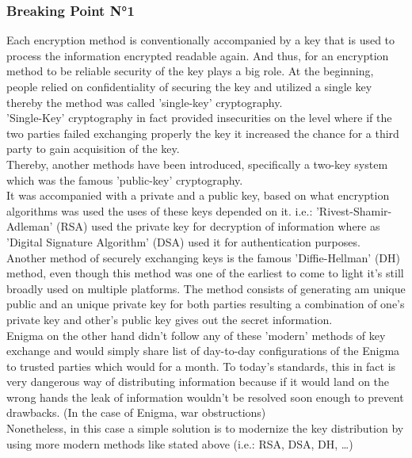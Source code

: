 \documentclass[conference,compsoc]{IEEEtran}
\begin{document}
\subsubsection{Breaking Point N°1} Each encryption method is conventionally accompanied by a key that is used to process the information encrypted readable again. And thus, for an encryption method to be reliable security of the key plays a big role. At the beginning, people relied on confidentiality of securing the key and utilized a single key thereby the method was called 'single-key' cryptography.\\
'Single-Key' cryptography in fact provided insecurities on the level where if the two parties failed exchanging properly the key it increased the chance for a third party to gain acquisition of the key.\\
Thereby, another methods have been introduced, specifically a two-key system which was the famous 'public-key' cryptography.\\
It was accompanied with a private and a public key, based on what encryption algorithms was used the uses of these keys depended on it. i.e.: 'Rivest-Shamir-Adleman' (RSA) used the private key for decryption of information where as 'Digital Signature Algorithm' (DSA) used it for authentication purposes.\\
Another method of securely exchanging keys is the famous 'Diffie-Hellman' (DH) method, even though this method was one of the earliest to come to light it's still broadly used on multiple platforms. The method consists of generating am unique public and an unique private key for both parties resulting a combination of one's private key and other's public key gives out the secret information.\\
Enigma on the other hand didn't follow any of these 'modern' methods of key exchange and would simply share list of day-to-day configurations of the Enigma to trusted parties which would for a month. To today's standards, this in fact is very dangerous way of distributing information because if it would land on the wrong hands the leak of information wouldn't be resolved soon enough to prevent drawbacks. (In the case of Enigma, war obstructions)\\ 
Nonetheless, in this case a simple solution is to modernize the key distribution by using more modern methods like stated above (i.e.:  RSA, DSA, DH, \ldots)
\end{document}
